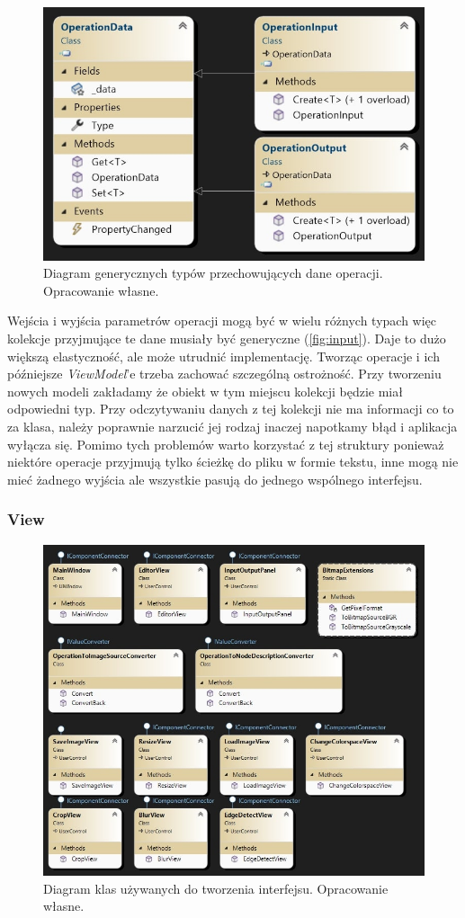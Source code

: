 \begin{figure}[H]
    \centering
    \includegraphics[width=0.6\linewidth]{images/Picture12.jpg}
    \caption{Diagram generycznych typów przechowujących dane operacji. Opracowanie własne.}
    \label{fig:input}
\end{figure}

Wejścia i wyjścia parametrów operacji mogą być w wielu różnych typach więc kolekcje przyjmujące te dane musiały być generyczne (\autoref{fig:input}). 
Daje to dużo większą elastyczność, ale może utrudnić implementację. 
Tworząc operacje i ich późniejsze \textit{ViewModel}'e trzeba zachować szczególną ostrożność. 
Przy tworzeniu nowych modeli zakładamy że obiekt w tym miejscu kolekcji będzie miał odpowiedni typ. 
Przy odczytywaniu danych z tej kolekcji nie ma informacji co to za klasa, należy poprawnie narzucić jej rodzaj inaczej napotkamy błąd i aplikacja wyłącza się.
Pomimo tych problemów warto korzystać z tej struktury ponieważ niektóre operacje przyjmują tylko ścieżkę do pliku w formie tekstu, inne mogą nie mieć żadnego wyjścia ale wszystkie pasują do jednego wspólnego interfejsu.

\subsubsection{View} 

\begin{figure}[H]
    \centering
    \includegraphics[width=0.8\linewidth]{images/Picture19.jpg}
    \caption{Diagram klas używanych do tworzenia interfejsu. Opracowanie własne.}
    \label{fig:viewArch}
\end{figure}

